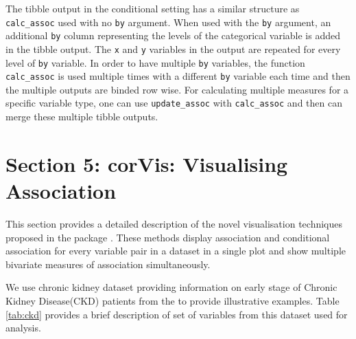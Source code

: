 The tibble output in the conditional setting has a similar structure as
\texttt{calc\_assoc} used with no \texttt{by} argument. When used with
the \texttt{by} argument, an additional \texttt{by} column representing
the levels of the categorical variable is added in the tibble output.
The \texttt{x} and \texttt{y} variables in the output are repeated for
every level of \texttt{by} variable. In order to have multiple
\texttt{by} variables, the function \texttt{calc\_assoc} is used
multiple times with a different \texttt{by} variable each time and then
the multiple outputs are binded row wise. For calculating multiple
measures for a specific variable type, one can use
\texttt{update\_assoc} with \texttt{calc\_assoc} and then can merge
these multiple tibble outputs.

\hypertarget{section-5-corvis-visualising-association}{%
\section{Section 5: corVis: Visualising
Association}\label{section-5-corvis-visualising-association}}

This section provides a detailed description of the novel visualisation
techniques proposed in the package . These methods
display association and conditional association for every variable pair
in a dataset in a single plot and show multiple bivariate measures of
association simultaneously.

We use chronic kidney dataset providing information on early stage of
Chronic Kidney Disease(CKD) patients from the \citep{Dua:2019} to
provide illustrative examples. Table \ref{tab:ckd} provides a brief
description of set of variables from this dataset used for analysis.

